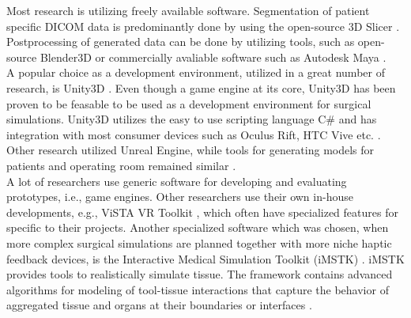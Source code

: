 Most research is utilizing freely available software.
Segmentation of patient specific DICOM data is predominantly done by using the open-source 3D Slicer \cite{Barber.2018,Barber.2020}.
Postprocessing of generated data can be done by utilizing tools, such as open-source Blender3D or commercially avaliable software such as Autodesk Maya \cite{Barber.2020,Parham.2019,Sampogna.2017}.
\\ A popular choice as a development environment, utilized in a great number of research, is Unity3D \cite{Parham.2019,Pulijala.2017,Sampogna.2017}.
Even though a game engine at its core, Unity3D has been proven to be feasable to be used as a development environment for surgical simulations.
Unity3D utilizes the easy to use scripting language C\# and has integration with most consumer devices such as Oculus Rift, HTC Vive etc. \cite{wang2010new}.
\\
Other research utilized Unreal Engine, while tools for generating models for patients and operating room remained similar \cite{Barber.2020}.
\\
A lot of researchers use generic software for developing and evaluating prototypes, i.e., game engines. Other researchers use their own in-house developments, e.g., ViSTA VR Toolkit \cite{RN70}, which often 
have specialized features for specific to their projects.
Another specialized software which was chosen, when more complex surgical simulations are planned together with more niche haptic feedback devices, is 
the Interactive Medical Simulation Toolkit (iMSTK) \cite{VenkataS.Arikatla.2018}.
iMSTK provides tools to realistically simulate tissue. 
The framework contains advanced algorithms for modeling of tool-tissue interactions that capture the behavior of 
aggregated tissue and organs at their boundaries or interfaces \cite{VenkataS.Arikatla.2018}.